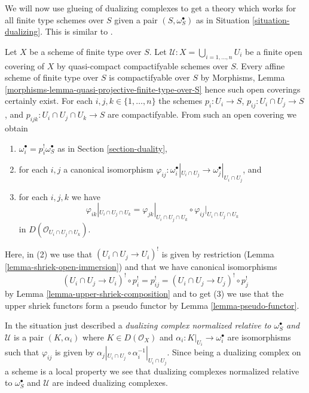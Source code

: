 \noindent
We will now use glueing of dualizing complexes to get a theory which works for
all finite type schemes over $S$ given a pair $(S, \omega_S^\bullet)$
as in Situation \ref{situation-dualizing}. This is similar to
\cite[Remark on page 310]{RD}.

\medskip\noindent
Let $X$ be a scheme of finite type over $S$.
Let $\mathcal{U} : X = \bigcup_{i = 1, \ldots, n} U_i$
be a finite open covering of $X$ by quasi-compact compactifyable
schemes over $S$. Every affine scheme of finite type
over $S$ is compactifyable over $S$ by
Morphisms, Lemma \ref{morphisms-lemma-quasi-projective-finite-type-over-S}
hence such open coverings certainly exist.
For each $i, j, k \in \{1, \ldots, n\}$
the schemes $p_i : U_i \to S$, $p_{ij} : U_i \cap U_j \to S$,
and $p_{ijk} : U_i \cap U_j \cap U_k \to S$ are compactifyable.
From such an open covering we obtain
\begin{enumerate}
\item $\omega_i^\bullet = p_i^!\omega_S^\bullet$
as in Section \ref{section-duality},
\item for each $i, j$ a canonical isomorphism
$\varphi_{ij} :
\omega_i^\bullet|_{U_i \cap U_j} \to \omega_j^\bullet|_{U_i \cap U_j}$, and
\item
\label{item-cocycle-glueing}
for each $i, j, k$ we have
$$
\varphi_{ik}|_{U_i \cap U_j \cap U_k} =
\varphi_{jk}|_{U_i \cap U_j \cap U_k} \circ
\varphi_{ij}|_{U_i \cap U_j \cap U_k}
$$
in $D(\mathcal{O}_{U_i \cap U_j \cap U_k})$.
\end{enumerate}
Here, in (2) we use that $(U_i \cap U_j \to U_i)^!$
is given by restriction (Lemma \ref{lemma-shriek-open-immersion})
and that we have canonical isomorphisms
$$
(U_i \cap U_j \to U_i)^! \circ p_i^! = p_{ij}^! =
(U_i \cap U_j \to U_j)^! \circ p_j^!
$$
by Lemma \ref{lemma-upper-shriek-composition} and to get (3) we use
that the upper shriek functors form a pseudo functor by
Lemma \ref{lemma-pseudo-functor}.

\medskip\noindent
In the situation just described a
{\it dualizing complex normalized relative to $\omega_S^\bullet$
and $\mathcal{U}$} is a pair $(K, \alpha_i)$ where $K \in D(\mathcal{O}_X)$
and $\alpha_i : K|_{U_i} \to \omega_i^\bullet$ are isomorphisms
such that $\varphi_{ij}$ is given by
$\alpha_j|_{U_i \cap U_j} \circ \alpha_i^{-1}|_{U_i \cap U_j}$.
Since being a dualizing complex on a scheme is a local property
we see that dualizing complexes normalized relative to $\omega_S^\bullet$
and $\mathcal{U}$ are indeed dualizing complexes.

